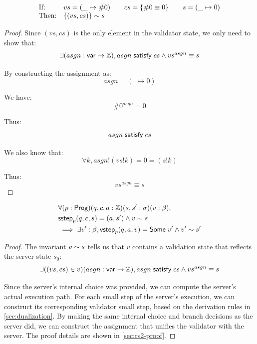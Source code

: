 \begin{lemma}[\ref{eq:rs1}]
\[\begin{array}{ll}
\text{If:}&
vs=(\_\mapsto\#0)\qquad
cs=\{\#0\equiv0\}\qquad
s=(\_\mapsto0)\\
\text{Then:}&\{(vs,cs)\}\sim s
\end{array}\]
\end{lemma}
\begin{proof}
Since $(vs,cs)$ is the only element in the validator state, we only need to show
that:
\[\exists(asgn:\mathsf{var}\to\mathbb Z),asgn\;\mathsf{satisfy}\;cs\wedge vs^{asgn}\equiv s\]

By constructing the assignment as: \[asgn=(\_\mapsto0)\]

We have: \[\#0^{asgn}=0\]

Thus: \[asgn\;\mathsf{satisfy}\;cs\]

We also know that: \[\forall k, asgn!(vs!k)=0=(s!k)\]

Thus: \[vs^{asgn}\equiv s\]
\end{proof}

\begin{lemma}[\ref{eq:rs2}]
  \begin{align*}
    &\forall(p:\mathsf{Prog})(q,c,a:\mathbb Z)(s,s':\sigma)(v:\beta),\\
    &\mathsf{sstep}_p(q,c,s)=(a,s')\wedge v\sim s\\
    &\implies\exists v':\beta,\mathsf{vstep}_p(q,a,v)=\mathsf{Some}\;v'\wedge v'\sim s'
  \end{align*}
\begin{proof}
The invariant $v\sim s$ tells us that $v$ contains a validation state
that reflects the server state $s_0$:
\[\exists((vs,cs)\in v)(asgn:\mathsf{var}\to\mathbb Z),asgn\;\mathsf{satisfy}\;cs\wedge {vs}^{asgn}\equiv s\]

Since the server's internal choice was provided, we can compute the server's
actual execution path.  For each small step of the server's execution, we can
construct its corresponding validator small step, based on the derivation rules
in \autoref{sec:dualization}.  By making the same internal choice and branch
decisions as the server did, we can construct the assignment that unifies the
validator with the server.  The proof details are shown in \autoref{sec:rs2-proof}.
\end{proof}
\end{lemma}

